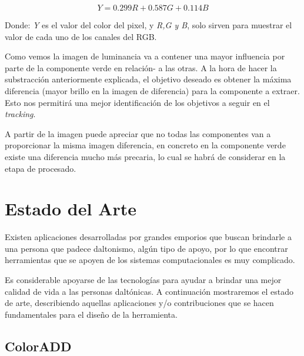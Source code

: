 \documentclass[10pt]{article}
\begin{document}
\begin{equation}\label{eq:ej}
Y = 0.299R + 0.587G + 0.114B 
\end{equation}

Donde: \textit{Y} es el valor del color del pixel, y \textit{R,G y B}, solo sirven para muestrar el valor de cada uno de los canales del RGB.

Como vemos la imagen de luminancia va a contener una
mayor influencia por parte de la componente verde en relación-
a las otras. A la hora de hacer la substracción anteriormente
explicada, el objetivo deseado es obtener la máxima diferencia
(mayor brillo en la imagen de diferencia) para la componente a
extraer. Esto nos permitirá una mejor identificación de los
objetivos a seguir en el \textit{tracking}\cite{IEEEreferencias:Ref47}.

A partir de la imagen puede apreciar que no todas las
componentes van a proporcionar la misma imagen diferencia, en
concreto en la componente verde existe una diferencia mucho
más precaria, lo cual se habrá de considerar en la etapa de
procesado\cite{IEEEreferencias:Ref47}. 

\section{Estado del Arte}
Existen aplicaciones desarrolladas por grandes emporios que buscan brindarle a una persona que padece daltonismo, algún tipo de apoyo, por lo que encontrar herramientas que se apoyen de los sistemas computacionales es muy complicado. 

Es considerable apoyarse de las tecnologías para ayudar a brindar una mejor calidad de vida a las personas daltónicas. A continuación mostraremos el estado de arte, describiendo aquellas aplicaciones y/o contribuciones que se hacen fundamentales para el diseño de la herramienta.

\subsection{ColorADD}
\end{document}

